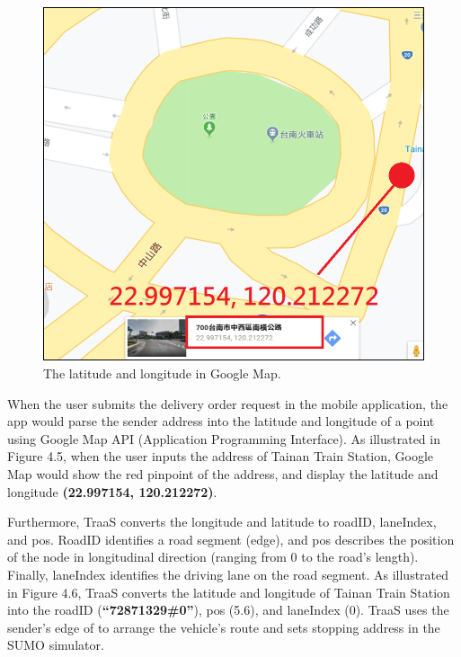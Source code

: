 \documentclass[12pt]{ksthesis}
\begin{document}
\begin{thesis}
{\begin{figure}[H]
\centering

\includegraphics[scale=1.0]{./Thesis_figures/F4-5_GPS_googleMap.PNG}
\caption{\large The latitude and longitude in Google Map.}
\vspace{0.5cm}
\label{Fig:GPS_in_GoggleMap}
\end{figure}


When the user submits the delivery order request in the mobile application, the app would parse the sender address into the latitude and longitude of a point using Google Map API (Application Programming Interface).
As illustrated in Figure 4.5, when the user inputs the address of Tainan Train Station, Google Map would show the red pinpoint of the address, and display the latitude and longitude \textbf{(22.997154, 120.212272)}.

Furthermore, TraaS converts the longitude and latitude to roadID, laneIndex, and pos. RoadID identifies a road segment (edge), and pos describes the position of the node in longitudinal direction (ranging from 0 to the road's length). Finally, laneIndex identifies the driving lane on the road segment.
As illustrated in Figure 4.6, TraaS converts the latitude and longitude of Tainan Train Station into the roadID (\textbf{“72871329\#0”}), pos (5.6), and laneIndex (0).
TraaS uses the sender’s edge of to arrange the vehicle’s route and sets stopping address in the SUMO simulator.

}
\end{thesis}
\end{document}

